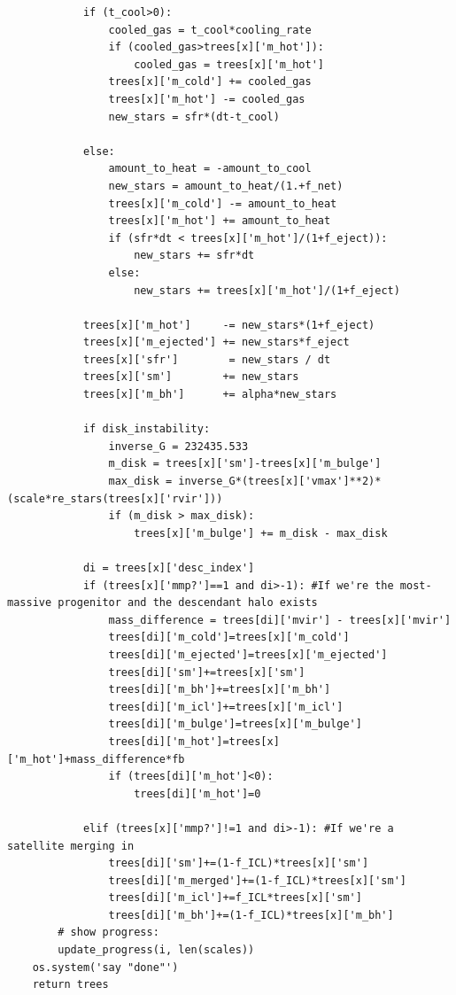 \documentclass[onecolumn]{aastex62}
\begin{document}
\begin{verbatim}
            if (t_cool>0):
                cooled_gas = t_cool*cooling_rate
                if (cooled_gas>trees[x]['m_hot']):
                    cooled_gas = trees[x]['m_hot']
                trees[x]['m_cold'] += cooled_gas
                trees[x]['m_hot'] -= cooled_gas
                new_stars = sfr*(dt-t_cool)

            else:
                amount_to_heat = -amount_to_cool
                new_stars = amount_to_heat/(1.+f_net)
                trees[x]['m_cold'] -= amount_to_heat
                trees[x]['m_hot'] += amount_to_heat
                if (sfr*dt < trees[x]['m_hot']/(1+f_eject)):
                    new_stars += sfr*dt
                else:
                    new_stars += trees[x]['m_hot']/(1+f_eject)

            trees[x]['m_hot']     -= new_stars*(1+f_eject) 
            trees[x]['m_ejected'] += new_stars*f_eject
            trees[x]['sfr']        = new_stars / dt
            trees[x]['sm']        += new_stars
            trees[x]['m_bh']      += alpha*new_stars

            if disk_instability:
                inverse_G = 232435.533
                m_disk = trees[x]['sm']-trees[x]['m_bulge']
                max_disk = inverse_G*(trees[x]['vmax']**2)*(scale*re_stars(trees[x]['rvir']))
                if (m_disk > max_disk):
                    trees[x]['m_bulge'] += m_disk - max_disk
            
            di = trees[x]['desc_index']
            if (trees[x]['mmp?']==1 and di>-1): #If we're the most-massive progenitor and the descendant halo exists
                mass_difference = trees[di]['mvir'] - trees[x]['mvir']
                trees[di]['m_cold']=trees[x]['m_cold']
                trees[di]['m_ejected']=trees[x]['m_ejected']
                trees[di]['sm']+=trees[x]['sm']
                trees[di]['m_bh']+=trees[x]['m_bh']
                trees[di]['m_icl']+=trees[x]['m_icl']
                trees[di]['m_bulge']=trees[x]['m_bulge']
                trees[di]['m_hot']=trees[x]['m_hot']+mass_difference*fb  
                if (trees[di]['m_hot']<0):
                    trees[di]['m_hot']=0
                    
            elif (trees[x]['mmp?']!=1 and di>-1): #If we're a satellite merging in
                trees[di]['sm']+=(1-f_ICL)*trees[x]['sm']
                trees[di]['m_merged']+=(1-f_ICL)*trees[x]['sm'] 
                trees[di]['m_icl']+=f_ICL*trees[x]['sm']
                trees[di]['m_bh']+=(1-f_ICL)*trees[x]['m_bh']
        # show progress:
        update_progress(i, len(scales))
    os.system('say "done"')
    return trees


\end{verbatim}
\end{document}
